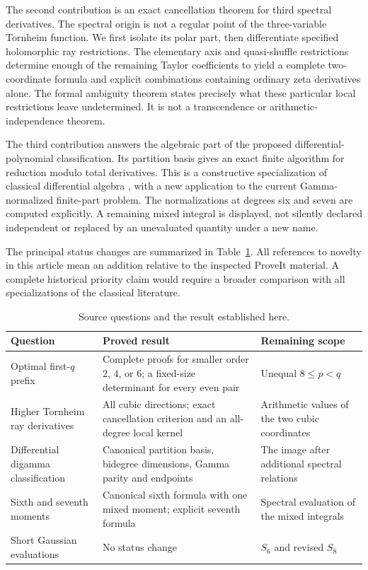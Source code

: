 The second contribution is an exact cancellation theorem for third
spectral derivatives. The spectral origin is not a regular point of
the three-variable Tornheim function. We first isolate its polar
part, then differentiate specified holomorphic ray restrictions.
The elementary axis and quasi-shuffle restrictions determine enough
of the remaining Taylor coefficients to yield a complete two-coordinate
formula and explicit combinations containing ordinary zeta derivatives
alone. The formal ambiguity theorem states precisely what these
particular local restrictions leave undetermined. It is not a
transcendence or arithmetic-independence theorem.

The third contribution answers the algebraic part of the proposed
differential-polynomial classification. Its partition basis gives
an exact finite algorithm for reduction modulo total derivatives.
This is a constructive specialization of classical differential
algebra \cite{OlverShakiban1978}, with a new application to the current
Gamma-normalized finite-part problem. The normalizations at degrees
six and seven are computed explicitly. A remaining mixed integral is displayed,
not silently declared independent or replaced by an unevaluated
quantity under a new name.

The principal status changes are summarized in
Table~\ref{tab:status}. All references to novelty in this article
mean an addition relative to the inspected ProveIt material.
A complete historical priority claim would require a broader
comparison with all specializations of the classical literature.

\begin{table}[htbp]
\centering\small
\caption{Source questions and the result established here.}
\label{tab:status}
\begin{tabular}{@{}p{}p{}p{}@{}}
\toprule
Question & Proved result & Remaining scope\\
\midrule
Optimal first-$q$ prefix & Complete proofs for smaller order $2$, $4$, or $6$; a fixed-size determinant for every even pair & Unequal $8\le p<q$\\[5pt]
Higher Tornheim ray derivatives & All cubic directions; exact cancellation criterion and an all-degree local kernel & Arithmetic values of the two cubic coordinates\\[5pt]
Differential digamma classification & Canonical partition basis, bidegree dimensions, Gamma parity and endpoints & The image after additional spectral relations\\[5pt]
Sixth and seventh moments & Canonical sixth formula with one mixed moment; explicit seventh formula & Spectral evaluation of the mixed integrals\\[5pt]
Short Gaussian evaluations & No status change & $S_6$ and revised $S_8$\\
\bottomrule
\end{tabular}
\end{table}

